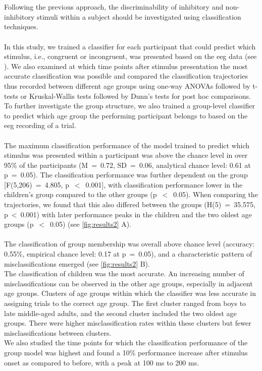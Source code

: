 \hyperref[pub:paperII]{}\\
\\
Following the previous approach, the discriminability of inhibitory and non-inhibitory stimuli within a subject should be investigated using classification techniques.\\
\\
In this study, we trained a classifier for each participant that could predict which stimulus, i.e., congruent or incongruent, was presented based on the \gls{eeg} data (see ). We also examined at which time points after stimulus presentation the most accurate classification was possible and compared the classification trajectories thus recorded between different age groups using one-way ANOVAs followed by t-tests or Kruskal-Wallis tests followed by Dunn's tests for post hoc comparisons.\\
To further investigate the group structure, we also trained a group-level classifier to predict which age group the performing participant belongs to based on the \gls{eeg} recording of a trial.\\
\\
The maximum classification performance of the model trained to predict which stimulus was presented within a participant was above the chance level in over 95\% of the participants (M~=~0.72, SD~=~0.06, analytical chance level: 0.61 at p~=~0.05). The classification performance was further dependent on the group [F(5,206)~=~4.805, p~$<$~0.001], with classification performance lower in the children's group compared to the other groups (p~$<$~0.05). When comparing the trajectories, we found that this also differed between the groups (H(5)~=~35.575, p~<~0.001) with later performance peaks in the children and the two oldest age groups (p~$<$~0.05) (see \autoref{fig:results2} A).\\
\\
The classification of group membership was overall above chance level (accuracy: 0.55\%, empirical chance level: 0.17 at p~=~0.05), and a characteristic pattern of misclassifications emerged (see \autoref{fig:results2} B).\\
The classification of children was the most accurate. An increasing number of misclassifications can be observed in the other age groups, especially in adjacent age groups. Clusters of age groups within which the classifier was less accurate in assigning trials to the correct age group. The first cluster ranged from boys to late middle-aged adults, and the second cluster included the two oldest age groups. There were higher misclassification rates within these clusters but fewer misclassifications between clusters.\\
We also studied the time points for which the classification performance of the group model was highest and found a 10\% performance increase after stimulus onset as compared to before, with a peak at 100 ms to 200 ms.

